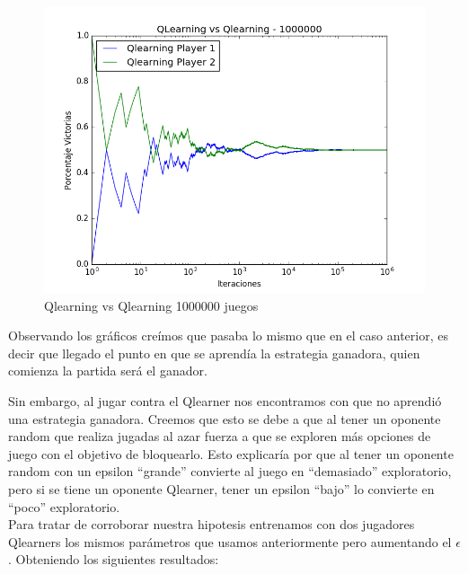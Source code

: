 \begin{figure}[H]
 \centering
 \begin{minipage}{.45\textwidth}
	\centering
	\includegraphics[scale=0.35]{img1/QlearningVsQlearning_1000000_6x5_merge.png}
        \caption{Qlearning vs Qlearning 1000000 juegos}
  \end{minipage}
\end{figure}

Observando los gráficos creímos que pasaba lo mismo que en el caso anterior, es decir que llegado el punto en que se aprendía la estrategia ganadora, quien comienza la partida será el ganador.

Sin embargo, al jugar contra el Qlearner nos encontramos con que no aprendió una estrategia ganadora. Creemos que esto se debe a que al tener un oponente random que realiza jugadas al azar fuerza a que se exploren más opciones de juego con el objetivo de bloquearlo.
Esto explicaría por que al tener un oponente random con un epsilon ``grande'' convierte al juego en ``demasiado'' exploratorio, pero si se tiene un oponente Qlearner, tener un epsilon ``bajo'' lo convierte en ``poco'' exploratorio. \\

Para tratar de corroborar nuestra hipotesis entrenamos con dos jugadores Qlearners los mismos parámetros que usamos anteriormente pero aumentando el $\epsilon$.
Obteniendo los siguientes resultados:

